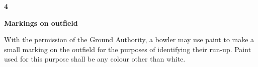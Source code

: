 \documentclass[12pt]{article}
\begin{document}
\vspace{\baselineskip}
{\fontsize{16pt}{19.2pt}\selectfont \textbf{4 \tabto{0.29in} }{\fontsize{15pt}{18.0pt}\selectfont \textbf{Markings on outfield}\par}\par}\par


\vspace{\baselineskip}
\begin{adjustwidth}{0.49in}{0.03in}
{\fontsize{8pt}{9.6pt}\selectfont With the permission of the Ground Authority, a bowler may use paint to make a small marking on the outfield for the purposes of identifying their run-up. Paint used for this purpose shall be any colour other than white.\par}\par

\end{adjustwidth}


\vspace{\baselineskip}

\vspace{\baselineskip}

\vspace{\baselineskip}

\vspace{\baselineskip}

\vspace{\baselineskip}

\vspace{\baselineskip}

\vspace{\baselineskip}

\vspace{\baselineskip}

\vspace{\baselineskip}

\vspace{\baselineskip}

\vspace{\baselineskip}

\vspace{\baselineskip}

\vspace{\baselineskip}

\vspace{\baselineskip}

\vspace{\baselineskip}

\vspace{\baselineskip}
\end{document}
